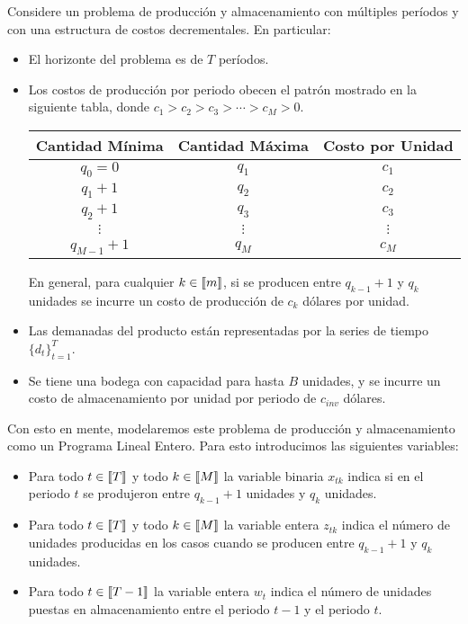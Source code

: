 \documentclass[ a4paper, twoside, 11pt]{article}
\begin{document}
\begin{problem}
Considere un problema de producci\'on y almacenamiento con m\'ultiples per\'iodos y con una estructura de costos decrementales. En particular: 
\begin{itemize}
\item El horizonte del problema es de $T$ per\'iodos. 
\item Los costos de producci\'on por periodo obecen el patr\'on mostrado en la siguiente tabla, donde $c_1 > c_2 > c_3 > \cdots > c_M > 0$. 
\begin{table}[htb]
\centering
\begin{tabular}{|c|c|c|}
\hline
\textbf{Cantidad M\'inima} & \textbf{Cantidad M\'axima} & \textbf{Costo por Unidad} \\ \hline
$q_0 = 0$ & $q_1$ & $c_1$ \\ \hline
$q_1+1$ & $q_2$ & $c_2$ \\ \hline
$q_2+1$ & $q_3$ & $c_3$ \\ \hline
$\vdots$ & $\vdots$ & $\vdots$ \\ \hline
$q_{M-1}+1$ & $q_M$ & $c_M$ \\ \hline
\end{tabular}
\end{table}

En general, para cualquier $k \in \llbracket m \rrbracket$, si se producen entre $q_{k-1} + 1$ y $q_k$ unidades se incurre un costo de producci\'on de $c_k$ d\'olares por unidad. 

\item Las demanadas del producto est\'an representadas por la series de tiempo $\{ d_t \}_{t=1}^T$. 
\item Se tiene una bodega con capacidad para hasta $B$ unidades, y se incurre un costo de almacenamiento por unidad por periodo de $c_{inv}$ d\'olares. 

\end{itemize}

Con esto en mente, modelaremos este problema de producci\'on y almacenamiento como un Programa Lineal Entero. Para esto introducimos las siguientes variables: 
\begin{itemize}
\item Para todo $t \in \llbracket T \rrbracket$ y todo $k \in \llbracket M \rrbracket$ la variable binaria $x_{tk}$ indica si en el periodo $t$ se produjeron entre $q_{k-1} + 1$ unidades y $q_k$ unidades. 
\item Para todo $t \in \llbracket T \rrbracket$ y todo $k \in \llbracket M \rrbracket$ la variable entera $z_{tk}$ indica el n\'umero de unidades producidas en los casos cuando se producen entre $q_{k-1}+1$ y $q_k$ unidades. 
\item Para todo $t \in \llbracket T-1 \rrbracket$ la variable entera $w_t$ indica el n\'umero de unidades puestas en almacenamiento entre el periodo $t-1$ y el periodo $t$. 
\end{itemize}


\end{problem}
\end{document}
